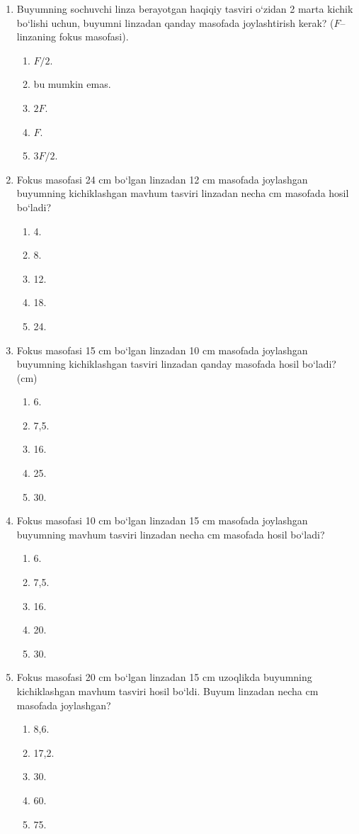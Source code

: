 \begin{enumerate}
\item Buyumning sochuvchi linza berayotgan haqiqiy tasviri o‘zidan 2 marta kichik bo‘lishi uchun, buyumni linzadan qanday masofada joylashtirish kerak? ($F$–linzaning fokus masofasi).
\begin{enumerate}[label=\Alph*)]
\item $F/2$.
\item bu mumkin emas.
\item $2F$.
\item $F$.
\item $3F/2$.
\end{enumerate}

\item Fokus masofasi 24 cm bo‘lgan linzadan 12 cm masofada joylashgan buyumning kichiklashgan mavhum tasviri linzadan necha cm masofada hosil bo‘ladi?
\begin{enumerate}[label=\Alph*)]
\item 4.
\item 8.
\item 12.
\item 18.
\item 24.
\end{enumerate}

\item Fokus masofasi 15 cm bo‘lgan linzadan 10 cm masofada joylashgan buyumning kichiklashgan tasviri linzadan qanday masofada hosil bo‘ladi? (cm)
\begin{enumerate}[label=\Alph*)]
\item 6.
\item 7,5.
\item 16.
\item 25.
\item 30.
\end{enumerate}

\item Fokus masofasi 10 cm bo‘lgan linzadan 15 cm masofada joylashgan buyumning mavhum tasviri linzadan necha cm masofada hosil bo‘ladi?
\begin{enumerate}[label=\Alph*)]
\item 6.
\item 7,5.
\item 16.
\item 20.
\item 30.
\end{enumerate}

\item Fokus masofasi 20 cm bo‘lgan linzadan 15 cm uzoqlikda buyumning kichiklashgan mavhum tasviri hosil bo‘ldi. Buyum linzadan necha cm masofada joylashgan?
\begin{enumerate}[label=\Alph*)]
\item 8,6.
\item 17,2.
\item 30.
\item 60.
\item 75.
\end{enumerate}


\end{enumerate}
